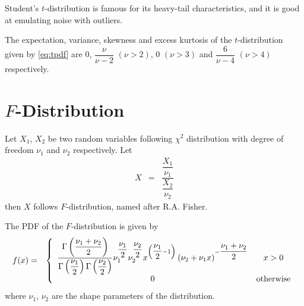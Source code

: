 Student's $t$-distribution is famous for its heavy-tail characteristics, and it is good at emulating noise with outliers.

The expectation, variance, skewness and excess kurtosis of the $t$-distribution given by \eqref{eq:tpdf} are $0$, $\dfrac{\nu}{\nu-2}$ $(\nu>2)$, $0$ $(\nu>3)$ and $\dfrac{6}{\nu-4}$ $(\nu>4)$ respectively.

\section{$F$-Distribution}

Let $X_1$, $X_2$ be two random variables following $\chi^2$ distribution with degree of freedom $\nu_1$ and $\nu_2$ respectively. Let
\begin{eqnarray}
	X &=& \dfrac{\dfrac{X_1}{\nu_1}}{\dfrac{X_2}{\nu_2}} \nonumber
\end{eqnarray}
then $X$ follows $F$-distribution, named after R.A. Fisher.

The PDF of the $F$-distribution is given by
\begin{eqnarray}
	f(x) &=& \left\{\begin{array}{cc}
		\dfrac{\Gamma\left(\dfrac{\nu_1+\nu_2}{2}\right)}{\Gamma\left(\dfrac{\nu_1}{2}\right)\Gamma\left(\dfrac{\nu_2}{2}\right)}\nu_1^{\dfrac{\nu_1}{2}}\nu_2^{\dfrac{\nu_2}{2}}x^{\left(\dfrac{\nu_1}{2}-1\right)}\left(\nu_2+\nu_1 x\right)^{-\dfrac{\nu_1+\nu_2}{2}} & x > 0 \\
		0 & \textup{otherwise}
	\end{array}\right. \nonumber
\end{eqnarray}
where $\nu_1$, $\nu_2$ are the shape parameters of the distribution.
